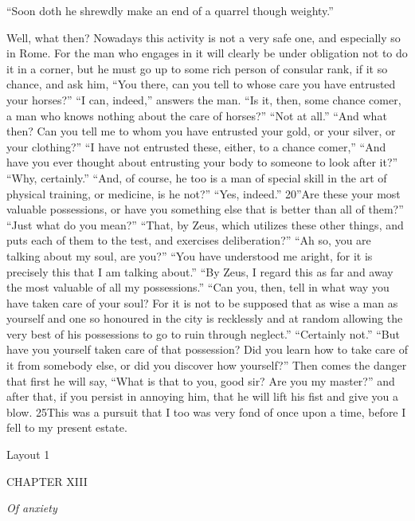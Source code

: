 ``Soon doth he shrewdly make an end of a quarrel though weighty.''

Well, what then? Nowadays this activity is not a very safe one, and especially so in Rome. For the man who engages in it will clearly be under obligation not to do it in a corner, but he must go up to some rich person of consular rank, if it so chance, and ask him, ``You there, can you tell to whose care you have entrusted your horses?'' ``I can, indeed,'' answers the man. ``Is it, then, some chance comer, a man who knows nothing about the care of horses?'' ``Not at all.'' ``And what then? Can you tell me to whom you have entrusted your gold, or your silver, or your clothing?'' ``I have not entrusted these, either, to a chance comer,'' ``And have you ever thought about entrusting your body to someone to look after it?'' ``Why, certainly.'' ``And, of course, he too is a man of special skill in the art of physical training, or medicine, is he not?'' ``Yes, indeed.'' 20''Are these your most valuable possessions, or have you something else that is better than all of them?'' ``Just what do you mean?'' ``That, by Zeus, which utilizes these other things, and puts each of them to the test, and exercises deliberation?'' ``Ah so, you are talking about my soul, are you?'' ``You have understood me aright, for it is precisely this that I am talking about.'' ``By Zeus, I regard this as far and away the most valuable of all my possessions.'' ``Can you, then, tell in what way you have taken care of your soul? For it is not to be supposed that as wise a man as yourself and one so honoured in the city is recklessly and at random allowing the very best of his possessions to go to ruin through neglect.'' ``Certainly not.'' ``But have you yourself taken care of that possession? Did you learn how to take care of it from somebody else, or did you discover how yourself?'' Then comes the danger that first he will say, ``What is that to you, good sir? Are you my master?'' and after that, if you persist in annoying him, that he will lift his fist and give you a blow. 25This was a pursuit that I too was very fond of once upon a time, before I fell to my present estate.



Layout 1

CHAPTER XIII

\emph{Of anxiety}

